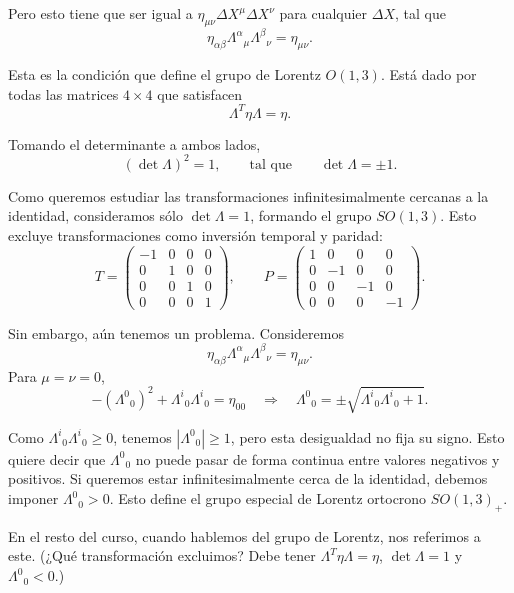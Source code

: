 \documentclass[11pt,a4paper]{article}
\newcommand{\concept}[1]{\textcolor{concept-green}{#1}}
\begin{document}
Pero esto tiene que ser igual a $\eta_{\mu\nu}\Delta X^\mu\Delta X^\nu$ para
cualquier $\Delta X$, tal que
\[
  \eta_{\alpha\beta}\Lambda^\alpha{}_{\mu}\Lambda^\beta{}_{\nu}
  =\eta_{\mu\nu}.
\]

Esta es la condición que define el \concept{grupo de Lorentz} $O(1,3)$. Está dado por todas las matrices $4\times4$ que satisfacen
\[
  \Lambda^T\eta\Lambda=\eta.
\]

Tomando el determinante a ambos lados,
\[
  (\det\Lambda)^2=1,
  \qquad\text{tal que}\qquad
  \det\Lambda=\pm1.
\]

Como queremos estudiar las transformaciones infinitesimalmente cercanas a la identidad, consideramos sólo $\det\Lambda=1$, formando el grupo $SO(1,3)$. Esto excluye transformaciones como inversión temporal y paridad:
\[
  T=
  \begin{pmatrix}
    -1&0&0&0\\
    0&1&0&0\\
    0&0&1&0\\
    0&0&0&1
  \end{pmatrix},
  \qquad
  P=
  \begin{pmatrix}
    1&0&0&0\\
    0&-1&0&0\\
    0&0&-1&0\\
    0&0&0&-1
  \end{pmatrix}.
\]

Sin embargo, aún tenemos un problema. Consideremos
\[
  \eta_{\alpha\beta}\Lambda^\alpha{}_{\mu}\Lambda^\beta{}_{\nu}
  =\eta_{\mu\nu}.
\]
Para $\mu=\nu=0$,
\[
  -(\Lambda^0{}_0)^2+\Lambda^i{}_0\Lambda^i{}_0=\eta_{00}
  \quad\Longrightarrow\quad
  \Lambda^0{}_0=\pm\sqrt{\Lambda^i{}_0\Lambda^i{}_0+1}.
\]

Como $\Lambda^i{}_0\Lambda^i{}_0\geq0$, tenemos $|\Lambda^0{}_0|\geq1$, pero esta desigualdad no fija su signo. Esto quiere decir que $\Lambda^0{}_0$ no puede pasar de forma continua entre valores negativos y positivos. Si queremos estar infinitesimalmente cerca de la identidad, debemos imponer $\Lambda^0{}_0>0$. Esto define el \concept{grupo especial de Lorentz ortocrono} $SO(1,3)_+$.

En el resto del curso, cuando hablemos del grupo de Lorentz, nos referimos a este. (¿Qué transformación excluimos? Debe tener $\Lambda^T\eta\Lambda=\eta$, $\det\Lambda=1$ y $\Lambda^0{}_0<0$.)
\end{document}
